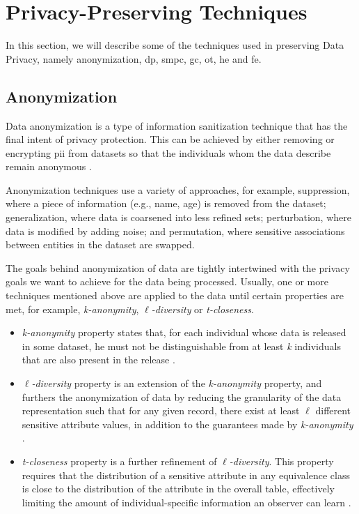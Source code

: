 \section{Privacy-Preserving Techniques}
\label{sec:PrivacyPreservingTechniques}


 In this section, we will describe some of the techniques used in preserving Data Privacy, namely anonymization, \ac{dp}, \ac{smpc}, \ac{gc}, \ac{ot}, \ac{he} and \ac{fe}.


\subsection{Anonymization}
\label{ssec:Anonymization}


Data anonymization is a type of information sanitization technique that has the final intent of privacy protection. This can be achieved by either removing or encrypting \ac{pii} from datasets so that the individuals whom the data describe remain anonymous \cite{raghunathan2013}.

Anonymization techniques use a variety of approaches, for example, suppression, where a piece of information (e.g., name, age) is removed from the dataset; generalization, where data is coarsened into less refined sets; perturbation, where data is modified by adding noise; and permutation, where sensitive associations between entities in the dataset are swapped.

The goals behind anonymization of data are tightly intertwined with the privacy goals we want to achieve for the data being processed. Usually, one or more techniques mentioned above are applied to the data until certain properties are met, for example, \textit{k-anonymity}, $\ell$\textit{-diversity} or \textit{t-closeness}.

\begin{itemize}
    \item \textit{k-anonymity} property states that, for each individual whose data is released in some dataset, he must not be distinguishable from at least \textit{k} individuals that are also present in the release \cite{sweeney2002k}. 

    \item $\ell$\textit{-diversity} property is an extension of the \textit{k-anonymity} property, and furthers the anonymization of data by reducing the granularity of the data representation such that for any given record, there exist at least $\ell$ different sensitive attribute values, in addition to the guarantees made by \textit{k-anonymity} \cite{machanavajjhala2007diversity}.

    \item \textit{t-closeness} property is a further refinement of $\ell$\textit{-diversity}. This property requires that the distribution of a sensitive attribute in any equivalence class is close to the distribution of the attribute in the overall table, effectively limiting the amount of individual-specific information an observer can learn \cite{li2007t}.  
\end{itemize} 



